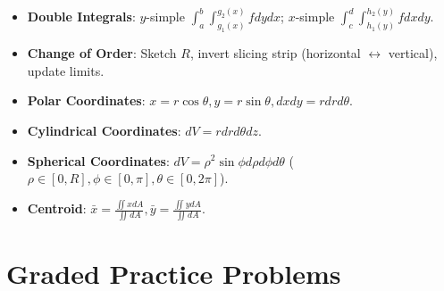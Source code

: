 \begin{quickrevision}
\begin{itemize}
    \item \textbf{Double Integrals}: $y$-simple $\int_a^b \int_{g_1(x)}^{g_2(x)} f dy dx$; $x$-simple $\int_c^d \int_{h_1(y)}^{h_2(y)} f dx dy$.
    \item \textbf{Change of Order}: Sketch $R$, invert slicing strip (horizontal $\leftrightarrow$ vertical), update limits.
    \item \textbf{Polar Coordinates}: $x = r\cos\theta, y = r\sin\theta, dx dy = r dr d\theta$.
    \item \textbf{Cylindrical Coordinates}: $dV = r dr d\theta dz$.
    \item \textbf{Spherical Coordinates}: $dV = \rho^2\sin\phi d\rho d\phi d\theta$ ($\rho \in [0, R], \phi \in [0, \pi], \theta \in [0, 2\pi]$).
    \item \textbf{Centroid}: $\bar{x} = \frac{\iint x dA}{\iint dA}, \bar{y} = \frac{\iint y dA}{\iint dA}$.
\end{itemize}
\end{quickrevision}

\section{Graded Practice Problems}

